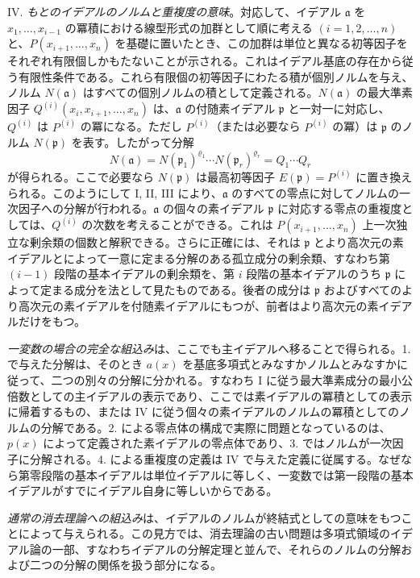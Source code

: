 \documentclass[11pt]{article}
\begin{document}
IV. \emph{もとのイデアルのノルムと重複度の意味}。対応して、イデアル $\mathfrak a$ を $x_1,\ldots,x_{i-1}$ の冪積における線型形式の加群として順に考える $(i=1,2,\ldots,n)$ と、$P(x_{i+1},\ldots,x_n)$ を基礎に置いたとき、この加群は単位と異なる初等因子をそれぞれ有限個しかもたないことが示される。これはイデアル基底の存在から従う有限性条件である。これら有限個の初等因子にわたる積が個別ノルムを与え、ノルム $N(\mathfrak a)$ はすべての個別ノルムの積として定義される。$N(\mathfrak a)$ の最大準素因子 $Q^{(i)}(x_i,x_{i+1},\ldots,x_n)$ は、$\mathfrak a$ の付随素イデアル $\mathfrak p$ と一対一に対応し、$Q^{(i)}$ は $P^{(i)}$ の冪になる。ただし $P^{(i)}$（または必要なら $P^{(i)}$ の冪）は $\mathfrak p$ のノルム $N(\mathfrak p)$ を表す。したがって分解
\[
 N(\mathfrak a)=N(\mathfrak p_1)^{\varrho_1}\cdots N(\mathfrak p_r)^{\varrho_r}=Q_1\cdots Q_r
\]
が得られる。ここで必要なら $N(\mathfrak p)$ は最高初等因子 $E(\mathfrak p)=P^{(i)}$ に置き換えられる。このようにして I, II, III により、$\mathfrak a$ のすべての零点に対してノルムの一次因子への分解が行われる。$\mathfrak a$ の個々の素イデアル $\mathfrak p$ に対応する零点の重複度としては、$Q^{(i)}$ の次数を考えることができる。これは $P(x_{i+1},\ldots,x_n)$ 上一次独立な剰余類の個数と解釈できる。さらに正確には、それは $\mathfrak p$ とより高次元の素イデアルとによって一意に定まる分解のある孤立成分の剰余類、すなわち第 $(i-1)$ 段階の基本イデアルの剰余類を、第 $i$ 段階の基本イデアルのうち $\mathfrak p$ によって定まる成分を法として見たものである。後者の成分は $\mathfrak p$ およびすべてのより高次元の素イデアルを付随素イデアルにもつが、前者はより高次元の素イデアルだけをもつ。

\emph{一変数の場合の完全な組込み}は、ここでも主イデアルへ移ることで得られる。1. で与えた分解は、そのとき $a(x)$ を基底多項式とみなすかノルムとみなすかに従って、二つの別々の分解に分かれる。すなわち I に従う最大準素成分の最小公倍数としての主イデアルの表示であり、ここでは素イデアルの冪積としての表示に帰着するもの、または IV に従う個々の素イデアルのノルムの冪積としてのノルムの分解である。2. による零点体の構成で実際に問題となっているのは、$p(x)$ によって定義された素イデアルの零点体であり、3. ではノルムが一次因子に分解される。4. による重複度の定義は IV で与えた定義に従属する。なぜなら第零段階の基本イデアルは単位イデアルに等しく、一変数では第一段階の基本イデアルがすでにイデアル自身に等しいからである。

\emph{通常の消去理論への組込み}は、イデアルのノルムが終結式としての意味をもつことによって与えられる。この見方では、消去理論の古い問題は多項式領域のイデアル論の一部、すなわちイデアルの分解定理と並んで、それらのノルムの分解および二つの分解の関係を扱う部分になる。
\end{document}
